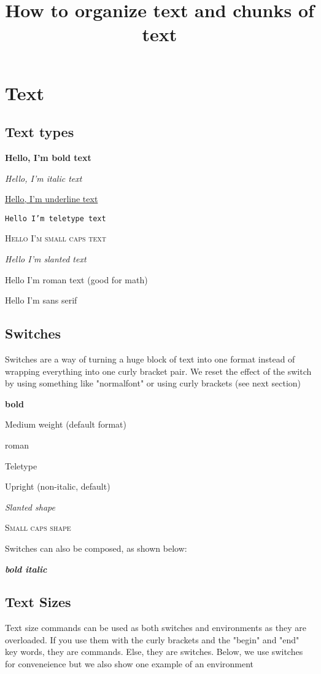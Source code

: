 \documentclass[12pt]{report}
\title{How to organize text and chunks of text}
\begin{document}
\maketitle

\chapter{Text}
\section{Text types}
\textbf{Hello, I'm bold text}

\textit{Hello, I'm italic text}

\underline{Hello, I'm underline text}

\texttt{Hello I'm teletype text}

\textsc{Hello I'm small caps text}

\textsl{Hello I'm slanted text}

\textrm{Hello I'm roman text (good for math)}

\textsf{Hello I'm sans serif}

\section{Switches}
Switches are a way of turning a huge block of text into one format instead of wrapping everything into one curly bracket pair. We reset the effect of the switch by using something like "normalfont" or using curly brackets (see next section)

\bfseries
bold 
\normalfont 

\mdseries
Medium weight (default format)
\normalfont 

\rmfamily
roman
\normalfont 

\ttfamily 
Teletype 
\normalfont 

\upshape 
Upright (non-italic, default)
\normalfont 

\slshape 
Slanted shape 
\normalfont

\scshape
Small caps shape
\normalfont 

 Switches can also be composed, as shown below: 

\bfseries \slshape 
bold italic 
\normalfont 

\section{Text Sizes}
Text size commands can be used as both switches and environments as they are overloaded. If you use them with the curly brackets and the "begin" and "end" key words, they are commands. Else, they are switches. Below, we use switches for conveneience but we also show one example of an environment 
\end{document}
